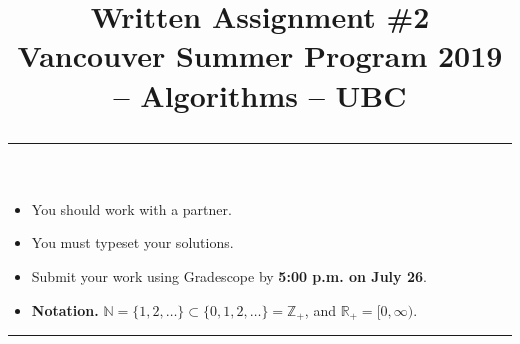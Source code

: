 \documentclass[11pt]{article}
\title{
  Written Assignment \#2 \\[0.5em]
  \large
  Vancouver Summer Program 2019 -- Algorithms -- UBC \\
  \vspace*{0.2in} \hrule
}
\date{}
\newcommand{\R}{\mathbb{R}}
\newcommand{\Z}{\mathbb{Z}}
\newcommand{\N}{\mathbb{N}}
\begin{document}
\maketitle

\setlength{\baselineskip}{0.90\baselineskip}




\pagestyle{empty}

\vspace*{-0.75in}


\begin{itemize}
\item You should work with a partner.
\item You must typeset your solutions.
\item Submit your work using Gradescope by {\bf 5:00 p.m. on July 26}.
\item \textbf{Notation.} $\N = \{1,2,\dotsc\} \subset \{0,1,2,\dotsc\} = \Z_{+}$, and $\R_{+} = [0,\infty)$.
\end{itemize}

\hrule
\end{document}
